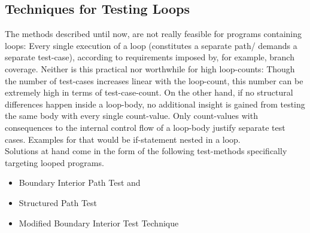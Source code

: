 	\subsection{Techniques for Testing Loops}
	The methods described until now, are not really feasible for programs containing loops: Every single execution of a loop (constitutes a separate path/ demands a separate test-case), according to requirements imposed by, for example, branch coverage. Neither is this practical nor worthwhile for high loop-counts: Though the number of test-cases increases linear with the loop-count, this number can be extremely high in terms of test-case-count. On the other hand, if no structural differences happen inside a loop-body, no additional insight is gained from testing the same body with every single count-value. Only count-values with consequences to the internal control flow of a loop-body justify separate test cases. Examples for that would be if-statement nested in a loop. \\
	Solutions at hand come in the form of the following test-methods specifically targeting looped programs.
	\begin{itemize} \setlength\itemsep{1px}
	\item Boundary Interior Path Test and
	\item Structured Path Test
	\item Modified Boundary Interior Test Technique
	
	
	\end{itemize}
